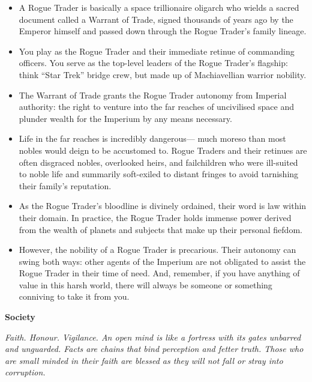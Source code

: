 \documentclass[10pt,a4paper]{article}
\newcommand{\rpgsection}[1]{%
  \vspace{0.8em}%
  {\headerfont\bfseries\Large #1}\par%
  \vspace{0.5em}%
}
\begin{document}
\begin{multicols}{2}
\begin{itemize}
  \item A Rogue Trader is basically a space trillionaire oligarch who wields a sacred document called a Warrant of Trade, signed thousands of years ago by the Emperor himself and passed down through the Rogue Trader's family lineage. 
  \item You play as the Rogue Trader and their immediate retinue of commanding officers. You serve as the top-level leaders of the Rogue Trader's flagship: think “Star Trek” bridge crew, but made up of Machiavellian warrior nobility. 
  \item The Warrant of Trade grants the Rogue Trader autonomy from Imperial authority: the right to venture into the far reaches of uncivilised space and plunder wealth for the Imperium by any means necessary.
  \item Life in the far reaches is incredibly dangerous— much moreso than most nobles would deign to be accustomed to. Rogue Traders and their retinues are often disgraced nobles, overlooked heirs, and failchildren who were ill-suited to noble life and summarily soft-exiled to distant fringes to avoid tarnishing their family’s reputation.
  \item As the Rogue Trader’s bloodline is divinely ordained, their word is law within their domain. In practice, the Rogue Trader holds immense power derived from the wealth of planets and subjects that make up their personal fiefdom.
  \item However, the nobility of a Rogue Trader is precarious. Their autonomy can swing both ways: other agents of the Imperium are not obligated to assist the Rogue Trader in their time of need. And, remember, if you have anything of value in this harsh world, there will always be someone or something conniving to take it from you.
\end{itemize}

\rpgsection{Society}
\textit{Faith. Honour. Vigilance. An open mind is like a fortress with its gates unbarred and unguarded. Facts are chains that bind perception and fetter truth. Those who are small minded in their faith are blessed as they will not fall or stray into corruption.}


\end{multicols}
\end{document}
